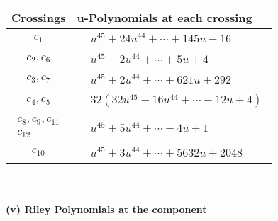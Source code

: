 \documentclass[1p]{elsarticle_modified}
\theoremstyle{definition}
\begin{document}
\begin{tabular}{m{50pt}|m{274pt}}
Crossings & \hspace{64pt}u-Polynomials at each crossing \\
\hline $$\begin{aligned}c_{1}\end{aligned}$$&$\begin{aligned}
&u^{45}+24 u^{44}+\cdots+145 u-16
\end{aligned}$\\
\hline $$\begin{aligned}c_{2},c_{6}\end{aligned}$$&$\begin{aligned}
&u^{45}-2 u^{44}+\cdots+5 u+4
\end{aligned}$\\
\hline $$\begin{aligned}c_{3},c_{7}\end{aligned}$$&$\begin{aligned}
&u^{45}+2 u^{44}+\cdots+621 u+292
\end{aligned}$\\
\hline $$\begin{aligned}c_{4},c_{5}\end{aligned}$$&$\begin{aligned}
&32(32 u^{45}-16 u^{44}+\cdots+12 u+4)
\end{aligned}$\\
\hline $$\begin{aligned}c_{8},c_{9},c_{11}\\c_{12}\end{aligned}$$&$\begin{aligned}
&u^{45}+5 u^{44}+\cdots-4 u+1
\end{aligned}$\\
\hline $$\begin{aligned}c_{10}\end{aligned}$$&$\begin{aligned}
&u^{45}+3 u^{44}+\cdots+5632 u+2048
\end{aligned}$\\
\hline
\end{tabular}\\~\\
\newpage\renewcommand{\arraystretch}{1}
\flushleft \textbf{(v) Riley Polynomials at the component}\newline \\
\end{document}
